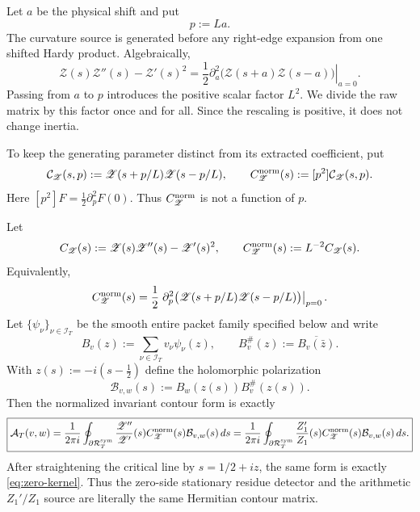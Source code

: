 Let $a$ be the physical shift and put
\[
p:=La.
\]
The curvature source is generated before any right-edge expansion from one
shifted Hardy product. Algebraically,
\begin{equation}
\mathscr Z(s)\mathscr Z''(s)-\mathscr Z'(s)^2
=\frac12\left.\partial_a^2\bigl(\mathscr Z(s+a)\mathscr Z(s-a)\bigr)\right|_{a=0}.
\label{eq:curvature-product}
\end{equation}
Passing from $a$ to $p$ introduces the positive scalar factor $L^2$. We divide
the raw matrix by this factor once and for all. Since the rescaling is
positive, it does not change inertia.

To keep the generating parameter distinct from its extracted coefficient, put
\begin{equation}
\mathcal C_{\mathscr Z}(s,p)
:=\mathscr Z(s+p/L)\mathscr Z(s-p/L),
\qquad
C_{\mathscr Z}^{\rm norm}(s):=[p^2]\mathcal C_{\mathscr Z}(s,p).
\label{eq:curvature-generating-family}
\end{equation}
Here $[p^2]F=\frac12\partial_p^2F(0)$.  Thus
$C_{\mathscr Z}^{\rm norm}$ is not a function of $p$.

\begin{proposition}
\label{prop:same-form-identity}
Let
\[
C_{\mathscr Z}(s):=\mathscr Z(s)\mathscr Z''(s)-\mathscr Z'(s)^2,
\qquad
C_{\mathscr Z}^{\rm norm}(s):=L^{-2}C_{\mathscr Z}(s).
\]
Equivalently,
\[
C_{\mathscr Z}^{\rm norm}(s)
=\frac12\left.\partial_p^2
\bigl(\mathscr Z(s+p/L)\mathscr Z(s-p/L)\bigr)\right|_{p=0}.
\]
Let $\{\psi_\nu\}_{\nu\in\mathcal I_T}$ be the smooth entire packet family
specified below and write
\[
B_v(z):=\sum_{\nu\in\mathcal I_T}v_\nu\psi_\nu(z),
\qquad B_v^\#(z):=\overline{B_v(\bar z)}.
\]
With $z(s):=-i(s-\tfrac12)$ define the holomorphic polarization
\begin{equation}
\boxed{\mathcal B_{v,w}(s):=B_w(z(s))B_v^\#(z(s)).}
\label{eq:packet-polarization}
\end{equation}
Then the normalized invariant contour form is exactly
\begin{equation}
\boxed{
\mathcal A_T(v,w)
=\frac1{2\pi i}\oint_{\partial\mathcal R_T^{\rm sym}}
\frac{\mathscr Z''}{\mathscr Z'}(s)
C_{\mathscr Z}^{\rm norm}(s)\mathcal B_{v,w}(s)\,ds
=\frac1{2\pi i}\oint_{\partial\mathcal R_T^{\rm sym}}
\frac{Z_1'}{Z_1}(s)
C_{\mathscr Z}^{\rm norm}(s)\mathcal B_{v,w}(s)\,ds.
}
\label{eq:same-form-identity}
\end{equation}
After straightening the critical line by $s=1/2+iz$, the same form is exactly
\eqref{eq:zero-kernel}. Thus the zero-side stationary residue detector and the
arithmetic $Z_1'/Z_1$ source are literally the same Hermitian contour matrix.
\end{proposition}

